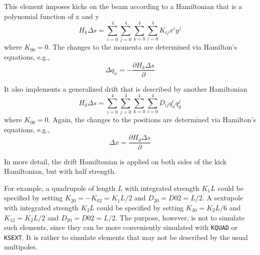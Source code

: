 This element imposes kicks on the beam according
to a Hamiltonian that is a polynomial function of x and y 
\begin{equation}
H_k\Delta s = \sum_{i=0}^{4} \sum_{j=0}^{4} \sum_{k=0}^4 \sum_{l=0}^4 K_{ij} x^i y^j 
\end{equation}
where $K_{00} = 0$.
The changes to the momenta are determined via Hamilton's equations, e.g.,
\begin{equation}
\Delta q_x = -\frac{\partial H_k\Delta s}{\partial}
\end{equation}

It also implements a generalized drift that is described by another Hamiltonian
\begin{equation}
H_d\Delta s = \sum_{i=0}^{4} \sum_{j=0}^{4} \sum_{k=0}^4 \sum_{l=0}^4 D_{ij} q_x^i q_y^j 
\end{equation}
where $K_{00} = 0$.
Again, the changes to the positions are determined via Hamilton's equations, e.g., 
\begin{equation}
\Delta x = \frac{\partial H_d\Delta s}{\partial}
\end{equation}

In more detail, the drift Hamiltonian is applied on both sides of the kick Hamiltonian, but with
half strength. 

For example, a quadrupole of length $L$ with integrated strength $K_1 L$  could be specified by setting
$K_{20} = -K_{02} = K_1 L/2$ and $D_20 = D02 = L/2$.
A sextupole with integrated strength $K_2 L$ could be specified by setting $K_{30} = K_2 L/6$ and $K_{12} = K_2 L/2$
and $D_20 = D02 = L/2$.
The purpose, however, is not to simulate such elements, since they can be more conveniently simulated with 
\verb|KQUAD| or \verb|KSEXT|.
It is rather to simulate elements that may not be described by the usual multipoles.